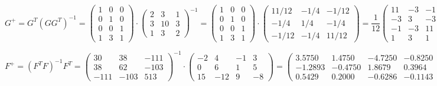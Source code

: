 \begin{equation*}
    G^+ = G^T (G G^T)^{-1} = 
    \begin{pmatrix}
        1 & 0 & 0\\
        0 & 1 & 0\\
        0 & 0 & 1\\
        1 & 3 & 1
    \end{pmatrix}
    \cdot
    \begin{pmatrix}
        2 & 3 & 1\\
        3 & 10 & 3\\
        1 & 3 & 2
    \end{pmatrix}^{-1}
    =
    \begin{pmatrix}
        1 & 0 & 0\\
        0 & 1 & 0\\
        0 & 0 & 1\\
        1 & 3 & 1
    \end{pmatrix}
    \cdot
    \begin{pmatrix}
        11/12 & -1/4 & -1/12\\
        -1/4 & 1/4 & -1/4\\
        -1/12 & -1/4 & 11/12
    \end{pmatrix}
    =
    \frac{1}{12}
    \begin{pmatrix}
        11 & -3 & -1\\
        -3 & 3 & -3\\
        -1 & -3 & 11\\
        1 & 3 & 1
    \end{pmatrix}
\end{equation*}

\begin{equation*}
    F^+ = (F^T F)^{-1} F^T =
    \begin{pmatrix}
        30 & 38 & -111\\
        38 & 62 & -103\\
        -111 & -103 & 513
    \end{pmatrix}^{-1}
    \cdot
    \begin{pmatrix}
        -2 & 4 & -1 & 3\\
        0 & 6 & 1 & 5\\
        15 & -12 & 9 & -8
    \end{pmatrix}
    =
    \begin{pmatrix}
        3.5750 & 1.4750 & -4.7250 & -0.8250\\
        -1.2893 & -0.4750 & 1.8679 & 0.3964\\
        0.5429 & 0.2000 & -0.6286 & -0.1143
    \end{pmatrix}
\end{equation*}

